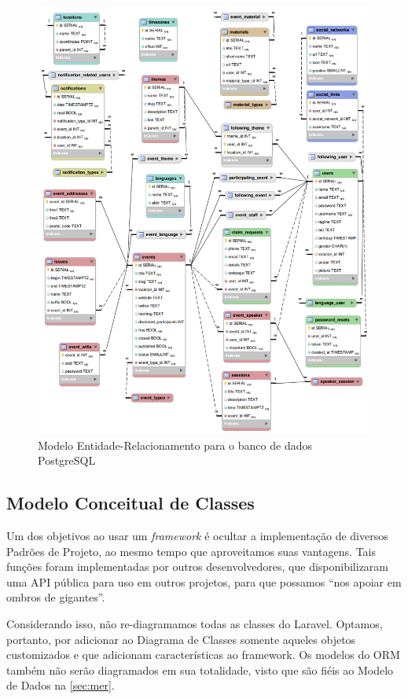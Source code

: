 \documentclass[12pt,a4paper,twoside,hyphens,english,brazil]{abntex2}
\begin{document}
{\begin{figure}
\centering
	\includegraphics[width=1\linewidth]{diagramas/modelo-dados.png}
	\caption{Modelo Entidade-Relacionamento para o banco de dados PostgreSQL}
	\label{diag:mer}
\end{figure}

\FloatBarrier
\subsection{Modelo Conceitual de Classes} \label{sec:classes}
Um dos objetivos ao usar um \emph{framework} é ocultar a implementação de diversos Padrões de Projeto, ao mesmo tempo que aproveitamos suas vantagens. Tais funções foram implementadas por outros desenvolvedores, que disponibilizaram uma API pública para uso em outros projetos, para que possamos ``nos apoiar em ombros de gigantes''.

Considerando isso, não re-diagramamos todas as classes do Laravel. Optamos, portanto, por adicionar ao Diagrama de Classes somente aqueles objetos customizados e que adicionam características ao framework. Os modelos do ORM também não serão diagramados em sua totalidade, visto que são fiéis ao Modelo de Dados na \autoref{sec:mer}.

}
\end{document}
